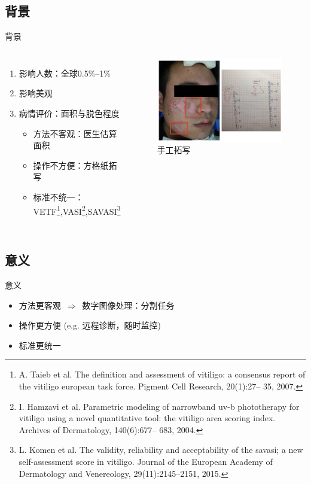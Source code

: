 \subsection{背景}

\begin{frame}{背景}
\begin{columns}[c]
\begin{enumerate}
\item 影响人数：全球0.5\%--1\%
\item 影响美观
\item 病情评价：面积与脱色程度
\begin{itemize}
\item 方法不客观：医生估算面积
\item 操作不方便：方格纸拓写
\item 标准不统一：VETF\footnote[frame]{\tiny A. Taieb et al. The definition
and assessment of vitiligo: a consensus report of the vitiligo
european task force. Pigment Cell Research, 20(1):27–
35, 2007.},VASI\footnote[frame]{\tiny I. Hamzavi et al. Parametric modeling of narrowband uv-b phototherapy
for vitiligo using a novel quantitative tool: the vitiligo
area scoring index. Archives of Dermatology, 140(6):677–
683, 2004.},SAVASI\footnote[frame]{\tiny L. Komen et al. The validity, reliability and acceptability
of the savasi; a new self-assessment score in vitiligo. Journal
of the European Academy of Dermatology and Venereology,
29(11):2145–2151, 2015.}
\end{itemize}
\end{enumerate}

\begin{figure}
    \centering
    \includegraphics[width=\linewidth]{figures/intro.png}
    \caption{手工拓写}
\end{figure}
\end{columns}
\end{frame}

\subsection{意义}
\begin{frame}{意义}
\begin{itemize}
\item 方法更客观~$\Rightarrow$~数字图像处理：分割任务
\item 操作更方便 (e.g. 远程诊断，随时监控)
\item 标准更统一 
\end{itemize}
\end{frame}


